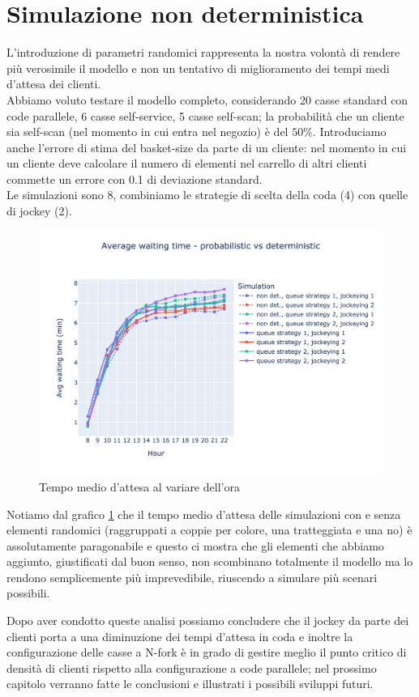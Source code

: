 \section{Simulazione non deterministica}

L'introduzione di parametri randomici rappresenta la nostra volontà di rendere più verosimile il modello e non un tentativo di miglioramento dei tempi medi d'attesa dei clienti. \\
Abbiamo voluto testare il modello completo, considerando 20 casse standard con code parallele, 6 casse self-service, 5 casse self-scan; la probabilità che un cliente sia self-scan (nel momento in cui entra nel negozio) è del $50\%$. Introduciamo anche l'errore di stima del basket-size da parte di un cliente: nel momento in cui un cliente deve calcolare il numero di elementi nel carrello di altri clienti commette un errore con 0.1 di deviazione standard. \\
Le simulazioni sono 8, combiniamo le strategie di scelta della coda (4) con quelle di jockey (2).

\begin{figure}[H]
	\centering
	\includegraphics[width=12cm]{"images/results/avg_wt_prob.png"}

	\caption{Tempo medio d'attesa al variare dell'ora}
	\label{fig:avg_wt_prob}
\end{figure}

Notiamo dal grafico \ref{fig:avg_wt_prob} che il tempo medio d'attesa delle simulazioni con e senza elementi randomici (raggruppati a coppie per colore, una tratteggiata e una no) è assolutamente paragonabile e questo ci mostra che gli elementi che abbiamo aggiunto, giustificati dal buon senso, non scombinano totalmente il modello ma lo rendono semplicemente più imprevedibile, riuscendo a simulare più scenari possibili.

\vspace*{1\baselineskip}

Dopo aver condotto queste analisi possiamo concludere che il jockey da parte dei clienti porta a una diminuzione dei tempi d'attesa in coda e inoltre la configurazione delle casse a N-fork è in grado di gestire meglio il punto critico di densità di clienti rispetto alla configurazione a code parallele; nel prossimo capitolo verranno fatte le conclusioni e illustrati i possibili sviluppi futuri.
